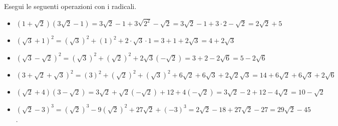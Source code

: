  \begin{esempio}
Esegui le seguenti operazioni con i radicali.
\begin{itemize}
 \item $(1+\sqrt{2})(3\sqrt{2}-1)=3\sqrt{2}-1+3\sqrt {2^2}-\sqrt{2}=
        3\sqrt{2}-1+3\cdot 2-\sqrt{2}=2\sqrt{2}+5$
 \item $(\sqrt{3}+1)^2=(\sqrt{3})^2+(1)^2+2\cdot \sqrt{3}\cdot 1=
        3+1+2\sqrt{3}=4+2\sqrt{3}$
 \item $(\sqrt{3}-\sqrt{2})^2=(\sqrt{3})^2+(\sqrt{2})^2+2 \sqrt{3}
(-\sqrt{2})=
        3+2-2\sqrt 6=5-2\sqrt 6$
 \item $(3+\sqrt{2}+\sqrt{3})^2=
        (3)^2+(\sqrt{2})^2+(\sqrt{3})^2+6 \sqrt{2}+6 \sqrt{3}+2 \sqrt{2}
\sqrt{3}=
        14+6\sqrt{2}+6\sqrt{3}+2\sqrt 6$
 \item $(\sqrt{2}+4)(3-\sqrt{2})=3\sqrt{2}
+\sqrt{2}(-\sqrt{2})+12+4(-\sqrt{2})=
        3\sqrt{2}-2+12-4\sqrt{2}=10-\sqrt{2}$
 \item $(\sqrt{2}-3)^3=(\sqrt{2})^3-9(\sqrt{2})^2+27\sqrt{2}+(-3)^3=
        2\sqrt{2}-18+27\sqrt{2}-27=29\sqrt{2}-45$.
\end{itemize}
 \end{esempio}


